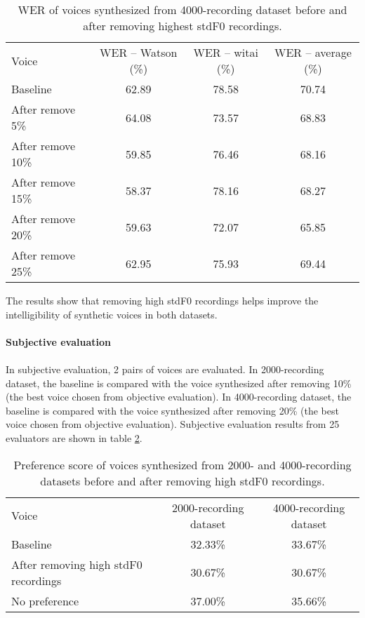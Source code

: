 \documentclass[12pt]{article}
\begin{document}
\begin{table}[]
\begin{center}
\caption{WER of voices synthesized from 4000-recording dataset before and after removing highest stdF0 recordings.}
\label{tab_werStdF04000}
\vspace{3mm}
\begin{tabular}{lccc}
\hline
Voice & WER – Watson (\%) & WER – witai (\%) & WER – average (\%)\\
\cmidrule(l{0pt}r{2pt}){1-1}\cmidrule(l{0pt}r{2pt}){2-2}\cmidrule(l{0pt}r{2pt}){3-3}\cmidrule(l{0pt}r{2pt}){4-4}
Baseline          & 62.89 & 78.58 & 70.74 \\
After remove 5\%  & 64.08 & 73.57 & 68.83 \\
After remove 10\% & 59.85 & 76.46 & 68.16 \\
After remove 15\% & 58.37 & 78.16 & 68.27 \\
After remove 20\% & 59.63 & 72.07 & 65.85 \\
After remove 25\% & 62.95 & 75.93 & 69.44 \\
\hline
\end{tabular}
\end{center}
\end{table}

The results show that removing high stdF0 recordings helps improve the intelligibility of synthetic voices in both datasets.\\\\
\textbf{Subjective evaluation}\\\\
In subjective evaluation, 2 pairs of voices are evaluated. In 2000-recording dataset, the baseline is compared with the voice synthesized after removing 10\% (the best voice chosen from objective evaluation). In 4000-recording dataset, the baseline is compared with the voice synthesized after removing 20\% (the best voice chosen from objective evaluation). Subjective evaluation results from 25 evaluators are shown in table \ref{tab_subEvaStsF0}.

\begin{table}[]
\begin{center}
\caption{Preference score of voices synthesized from 2000- and 4000-recording datasets before and after removing high stdF0 recordings.}
\label{tab_subEvaStsF0}
\vspace{3mm}
\begin{tabular}{lcc}
\hline
Voice & 2000-recording dataset & 4000-recording dataset \\
\cmidrule(l{0pt}r{2pt}){1-1}\cmidrule(l{0pt}r{2pt}){2-2}\cmidrule(l{0pt}r{2pt}){3-3}
Baseline & 32.33\% & 33.67\% \\
After removing high stdF0 recordings & 30.67\% & 30.67\% \\
No preference & 37.00\% & 35.66\% \\
\hline
\end{tabular}
\end{center}
\end{table}
\end{document}
